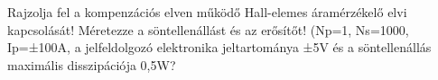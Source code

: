 \begin{example}

Rajzolja fel a kompenzációs elven működő Hall-elemes áramérzékelő elvi kapcsolását! 
Méretezze a söntellenállást és az erősítőt! (Np=1, Ns=1000, Ip=±100A, a jelfeldolgozó elektronika jeltartománya ±5V és a söntellenállás maximális disszipációja 0,5W?


\tcbline
\vspace{1mm}

\solution

\end{example}